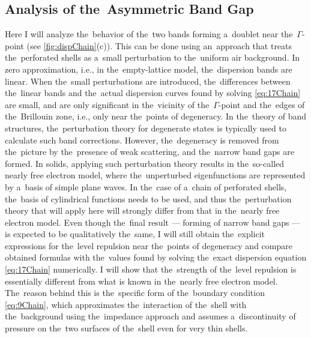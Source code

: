 


\subsection{Analysis of the~Asymmetric Band Gap}

Here I will analyze the~behavior of the~two bands forming a~doublet near the~$\Gamma$-point (see \cref{fig:dispChain}(c)).
This can be done using an~approach that treats the~perforated shells as a~small perturbation to the~uniform air background.
In zero approximation, i.e., in the~empty-lattice model, the~dispersion bands are linear.
When the~small perturbations are introduced, the~differences between the~linear bands and the~actual dispersion curves found by solving \cref{eq:17Chain} are small, and are only significant in the~vicinity of the~$\Gamma$-point and the~edges of the~Brillouin zone, i.e., only near the~points of degeneracy.
In the~theory of band structures, the~perturbation theory for degenerate states is typically used to calculate such band corrections.
However, the~degeneracy is removed from the~picture by the~presence of weak scattering, and the~narrow band gaps are formed.
In solids, applying such perturbation theory results in the~so-called nearly free electron model, where the~unperturbed eigenfunctions are represented by a~basis of simple plane waves.
In the~case of a~chain of perforated shells, the~basis of cylindrical functions needs to be used, and thus the~perturbation theory that will apply here will strongly differ from that in the~nearly free electron model.
Even though the~final result --- forming of narrow band gaps --- is expected to be qualitatively the~same, I will still obtain the~explicit expressions for the~level repulsion near the~points of degeneracy and compare obtained formulas with the~values found by solving the~exact dispersion equation \cref{eq:17Chain} numerically.
I will show that the~strength of the~level repulsion is essentially different from what is known in the~nearly free electron model.
The~reason behind this is the~specific form of the~boundary condition \cref{eq:9Chain}, which approximates the~interaction of the~shell with the~background using the~impedance approach and assumes a~discontinuity of pressure on the~two surfaces of the~shell even for very thin shells.

